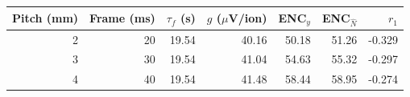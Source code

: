 \begin{tabular}{rrrrrrr}
\toprule
Pitch (mm) & Frame (ms) & $\tau_f$ (s) & $g$ ($\mu$V/ion) & ENC$_y$ & ENC$_{\widehat N}$ & $r_1$ \\
\midrule
2 & 20 & 19.54 & 40.16 & 50.18 & 51.26 & -0.329 \\
3 & 30 & 19.54 & 41.04 & 54.63 & 55.32 & -0.297 \\
4 & 40 & 19.54 & 41.48 & 58.44 & 58.95 & -0.274 \\
\bottomrule
\end{tabular}
